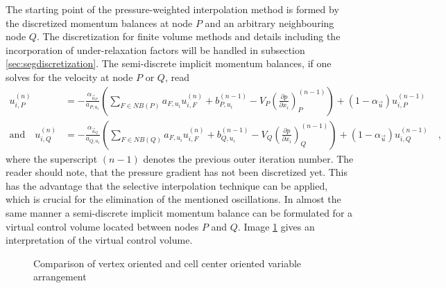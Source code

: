   The starting point of the pressure-weighted interpolation method is formed by the discretized momentum balances at node \(P\) and an arbitrary neighbouring node \(Q\). The discretization for finite volume methods and details including the incorporation of under-relaxation factors will be handled in subsection \ref{sec:segdiscretization}. The semi-discrete implicit momentum balances, if one solves for the velocity at node \(P\) or \(Q\), read
  \begin{subequations}
  \begin{align}
    u_{i,P}^{(n)} 
    &= 
    - \frac{\alpha_{\vec{u}_P}}{a_{P,u_i}} \left(\sum_{F \in NB(P)} a_{F,u_i} u_{i,F}^{(n)}
    +                                     b_{P,u_i}^{(n-1)} 
    -                                     V_P\left(\frac{\partial p}{\partial x_i}\right)_P^{(n-1)} \right)
    + \left(1 - \alpha_{\vec{u}}\right) u_{i,P}^{(n-1)}  \\[1em]
    \text{and} \quad
    u_{i,Q}^{(n)} 
    &= 
    - \frac{\alpha_{\vec{u}_Q}}{a_{Q,u_i}} \left(\sum_{F \in NB(Q)} a_{F,u_i} u_{i,F}^{(n)}
    +                                     b_{Q,u_i}^{(n-1)} 
    -                                     V_Q\left(\frac{\partial p}{\partial x_i}\right)_Q^{(n-1)}   \right)
    + \left(1 - \alpha_{\vec{u}}\right) u_{i,Q}^{(n-1)} \quad,
  \end{align}
  \end{subequations}
  where the superscript \((n-1)\) denotes the previous outer iteration number. The reader should note, that the pressure gradient has not been discretized yet. This has the advantage that the selective interpolation technique \cite{schaefer99} can be applied, which is crucial for the elimination of the mentioned oscillations. In almost the same manner a semi-discrete implicit momentum balance can be formulated for a virtual control volume located between nodes \(P\) and \(Q\). Image \ref{fig:virt} gives an interpretation of the virtual control volume.
  \begin{figure}
     \label{fig:virt}
        
        \centering{}
      \caption{Comparison of vertex oriented and cell center oriented variable arrangement}
  \end{figure}


